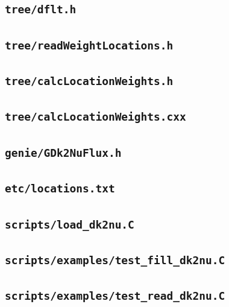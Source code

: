 \documentclass[11pt]{article}
\newcommand{\code}[1]{\texttt{#1}}
\begin{document}
\subsection{\code{tree/dflt.h}}


\subsection{\code{tree/readWeightLocations.h}}


\subsection{\code{tree/calcLocationWeights.h}}


\subsection{\code{tree/calcLocationWeights.cxx}}


\subsection{\code{genie/GDk2NuFlux.h}}


\subsection{\code{etc/locations.txt}}


\subsection{\code{scripts/load\_dk2nu.C}}


\subsection{\code{scripts/examples/test\_fill\_dk2nu.C}}


\subsection{\code{scripts/examples/test\_read\_dk2nu.C}}

\end{document}
